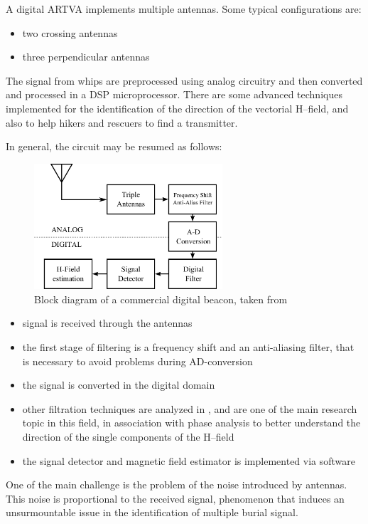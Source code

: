 A digital ARTVA implements multiple antennas. Some typical configurations are:
\begin{itemize}
\item two crossing antennas
\item three perpendicular antennas
\end{itemize}
The signal from whips are preprocessed using analog circuitry and then converted and processed in a DSP microprocessor. There are some advanced techniques\citep{Salos2007} implemented for the identification of the direction of the vectorial H--field, and also to help hikers and rescuers to find a transmitter. 

In general, the circuit may be resumed as follows:

\begin{figure}
	\centering
	\includegraphics[width=7cm]{ch1/img/img_schema_arva.pdf}
	\caption{Block diagram of a commercial digital beacon, taken from \citep{Salos2007}}
\end{figure}


\begin{itemize}
\item signal is received through the antennas
\item the first stage of filtering is a frequency shift and  an anti-aliasing filter, that is necessary to avoid problems during AD-conversion
\item the signal is converted in the digital domain
\item other filtration techniques are analyzed  in \citep{Salos2007}, and are one of the main research topic in this field, in association with phase analysis to better understand the direction of the single components of the H--field
\item the signal detector and magnetic field estimator is implemented via software
\end{itemize}

One of the main challenge is the problem of the noise introduced by antennas. This noise is proportional to the received signal, phenomenon that induces an unsurmountable issue in the identification of multiple burial signal.

